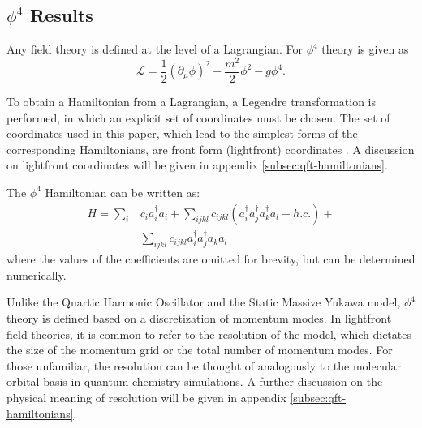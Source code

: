 \subsection{$\phi^4$ Results}
\label{sec:phi4_results}

Any field theory is defined at the level of a Lagrangian.
For $\phi^4$ theory is given as
\begin{equation}
    \mathcal{L} = \frac12 \left(\partial_\mu \phi \right)^2 - \frac{m^2}{2}\phi^2 - g\phi^4.
\end{equation}

To obtain a Hamiltonian from a Lagrangian, a Legendre transformation is performed, in which an explicit set of coordinates must be chosen. 
The set of coordinates used in this paper, which lead to the simplest forms of the corresponding Hamiltonians, are front form (lightfront) coordinates \cite{Dirac1949}.
A discussion on lightfront coordinates will be given in appendix \ref{subsec:qft-hamiltonians}.

The $\phi^4$ Hamiltonian can be written as:
\begin{align}
    H = \sum_i &c_i a_i^\dagger a_i + \sum_{ijkl}c_{ijkl} \left(a_i^\dagger a_j^\dagger a_k^\dagger a_l + h.c. \right) + \nonumber\\
    &\sum_{ijkl}c_{ijkl}a_i^\dagger a_j^\dagger a_k a_l
\end{align}
where the values of the coefficients are omitted for brevity, but can be determined numerically.

Unlike the Quartic Harmonic Oscillator and the Static Massive Yukawa model, $\phi^4$ theory is defined based on a discretization of momentum modes.
In lightfront field theories, it is common to refer to the resolution of the model, which dictates the size of the momentum grid or the total number of momentum modes.
For those unfamiliar, the resolution can be thought of analogously to the molecular orbital basis in quantum chemistry simulations.
A further discussion on the physical meaning of resolution will be given in appendix \ref{subsec:qft-hamiltonians}.

